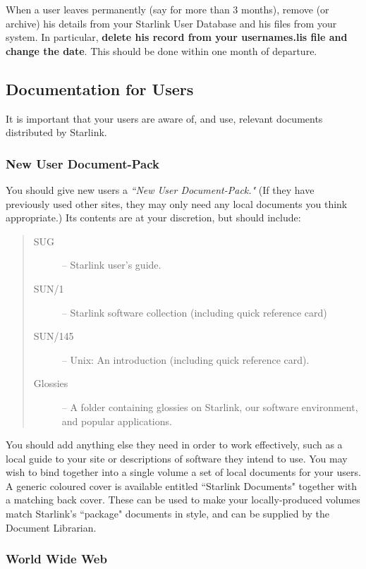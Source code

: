 \documentclass[twoside,11pt]{article}
\newcommand{\xref}[3]{#1}
\begin{document}
When a user leaves permanently (say for more than 3 months), remove (or archive)
his details from your Starlink User Database and his files from your system.
In particular, {\bf delete his record from your usernames.lis file and change
the date}.
This should be done within one month of departure.

\subsection{Documentation for Users}

It is important that your users are aware of, and use, relevant documents
distributed by Starlink.

\subsubsection{\label{NUDP}New User Document-Pack}

You should give new users a {\em ``New User Document-Pack."}
(If they have previously used other sites, they may only need any local
documents you think appropriate.)
Its contents are at your discretion, but should include:

\begin{quote}
\begin{description}
\item [\xref{SUG}{sug}{}] -- Starlink user's guide.
\item [\xref{SUN/1}{sun1}{}] -- Starlink software collection (including
quick reference card)
\item [\xref{SUN/145}{sun145}{}] -- Unix: An introduction (including quick
reference card).
\item [Glossies] -- A folder containing glossies on Starlink, our software
 environment, and popular applications.
\end{description}
\end{quote}

You should add anything else they need in order to work effectively, such
as a local guide to your site or descriptions of software they intend to use.
You may wish to bind together into a single volume a set of local documents
for your users.
A generic coloured cover is available entitled ``Starlink Documents" together
with a matching back cover.
These can be used to make your locally-produced volumes match Starlink's
``package" documents in style, and can be supplied by the Document Librarian.

\subsubsection{World Wide Web}
\end{document}
